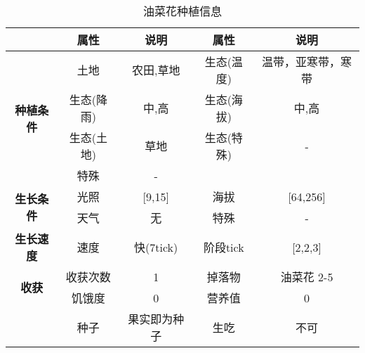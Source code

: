 \begin{table}[H]
    \centering
    \caption{油菜花种植信息}
    \label{table:油菜花种植信息}
    \setlength{\tabcolsep}{4mm}
    \begin{tabular}{c|cc|cc}
        \toprule
                                           & \textbf{属性} & \textbf{说明} & \textbf{属性} & \textbf{说明} \\
        \midrule
        \multirow{4}{*}{\textbf{种植条件}} & 土地          & 农田,草地          & 生态(温度)    & 温带，亚寒带，寒带  \\
                                           & 生态(降雨)    & 中,高            & 生态(海拔)    & 中,高            \\
                                           & 生态(土地)    & 草地          & 生态(特殊)    & -             \\
                                           & 特殊          & -                                             \\
        \midrule
        \multirow{2}{*}{\textbf{生长条件}} & 光照          & [9,15]        & 海拔          & [64,256]      \\
                                           & 天气          & 无            & 特殊          & -             \\
        \midrule
        \textbf{生长速度}                  & 速度          & 快(7tick)     & 阶段tick      & [2,2,3]       \\
        \midrule
        \multirow{2}{*}{\textbf{收获}}     & 收获次数      & 1             & 掉落物        & 油菜花 2-5      \\
                                           & 饥饿度        & 0             & 营养值        & 0             \\
                                           & 种子          & 果实即为种子  & 生吃          & 不可   \\
        \bottomrule
    \end{tabular}
\end{table}


\newpage